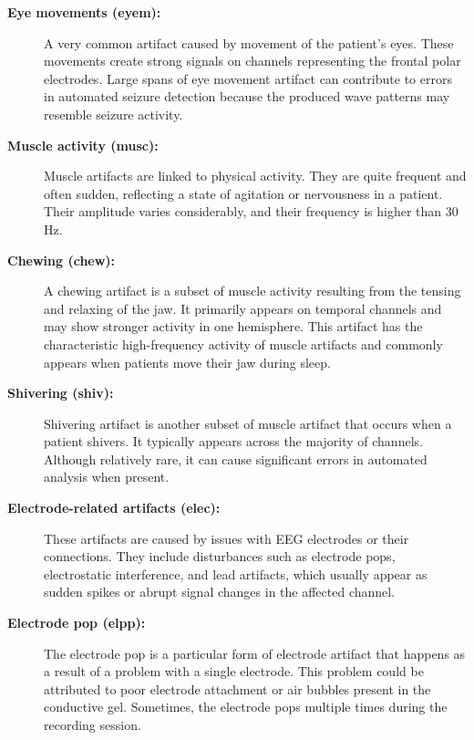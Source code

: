 \begin{description}

\item[\textbf{Eye movements (eyem):}] A very common artifact caused by movement of the patient’s eyes. These movements create strong signals on channels representing the frontal polar electrodes. Large spans of eye movement artifact can contribute to errors in automated seizure detection because the produced wave patterns may resemble seizure activity.

\item[\textbf{Muscle activity (musc):}] Muscle artifacts are linked to physical activity. They are quite frequent and often sudden, reflecting a state of agitation or nervousness in a patient. Their amplitude varies considerably, and their frequency is higher than 30 Hz.

\item[\textbf{Chewing (chew):}] A chewing artifact is a subset of muscle activity resulting from the tensing and relaxing of the jaw. It primarily appears on temporal channels and may show stronger activity in one hemisphere. This artifact has the characteristic high-frequency activity of muscle artifacts and commonly appears when patients move their jaw during sleep.

\item[\textbf{Shivering (shiv):}] Shivering artifact is another subset of muscle artifact that occurs when a patient shivers. It typically appears across the majority of channels. Although relatively rare, it can cause significant errors in automated analysis when present.

\item[\textbf{Electrode-related artifacts (elec):}] These artifacts are caused by issues with EEG electrodes or their connections. They include disturbances such as electrode pops, electrostatic interference, and lead artifacts, which usually appear as sudden spikes or abrupt signal changes in the affected channel.

\item[\textbf{Electrode pop (elpp):}] The electrode pop is a particular form of electrode artifact that happens as a result of a problem with a single electrode. This problem could be attributed to poor electrode attachment or air bubbles present in the conductive gel. Sometimes, the electrode pops multiple times during the recording session.

\end{description}

